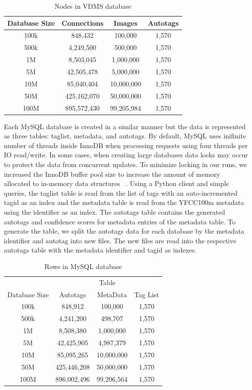 \begin{table}[h]
\caption{Nodes in VDMS database}
\centering
\begin{tabular}{c c c c}
\hline\hline
Database Size & Connections & Images & Autotags\\
\hline
100k & 848,432      & 100,000     & 1,570\\
500k & 4,249,500    & 500,000     & 1,570\\
1M   & 8,503,045    & 1,000,000   & 1,570\\
5M   & 42,505,478   & 5,000,000   & 1,570\\
10M  & 85,040,404   & 10,000,000  & 1,570\\
50M  & 425,162,070  & 50,000,000  & 1,570\\
100M & 895,572,430  & 99,205,984  & 1,570\\
\hline
\end{tabular}
\label{table:vdmsnodes}
\end{table}

Each MySQL database is created in a similar manner but the data is represented as three tables: taglist, metadata, and autotags.  By default, MySQL uses inifinite number of threads inside InnoDB when processing requests using four threads per IO read/write.  In some cases, when creating large databases data locks may occur to protect the data from concurrent updates.  To minimize locking in our runs, we increased the InnoDB buffer pool size to increase the amount of memory allocated to in-memory data structures ~\cite{mysql,mysql_blog}. Using a Python client and simple queries, the taglist table is read from the list of tags with an auto-incremented tagid as an index and the metadata table is read from the YFCC100m metadata using the identifier as an index. The autotags table contains the generated autotags and confidence scores for metadata entries of the metadata table. To generate the table, we split the autotags data for each database by the metadata identifier and autotag into new files. The new files are read into the respective autotags table with the metadata identifier and tagid as indexes.  

\begin{table}[h]
\caption{Rows in MySQL database}
\centering
\begin{tabular}{c c c c}
\hline\hline
 & \multicolumn{3}{c}{Table}\\
\cline{2-4}
Database Size & Autotags & MetaData & Tag List\\
\hline
100k & 848,912     & 100,000    & 1,570\\
500k & 4,241,200   & 498,707    & 1,570\\
1M   & 8,508,380   & 1,000,000  & 1,570\\
5M   & 42,425,905  & 4,987,379  & 1,570\\
10M  & 85,095,265  & 10,000,000 & 1,570\\
50M  & 425,446,208 & 50,000,000 & 1,570\\
100M & 896,002,496 & 99,206,564 & 1,570\\
\hline
\end{tabular}
\label{table:mysqltables}
\end{table}

